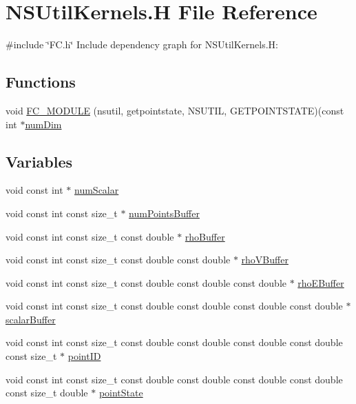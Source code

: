 \hypertarget{NSUtilKernels_8H}{}\section{N\+S\+Util\+Kernels.\+H File Reference}
\label{NSUtilKernels_8H}
{\ttfamily \#include \char`\"{}F\+C.\+h\char`\"{}}\newline
Include dependency graph for N\+S\+Util\+Kernels.\+H\+:
\subsection*{Functions}
\begin{DoxyCompactItemize}
\item 
void \hyperlink{NSUtilKernels_8H_a5abd4ece2d1e22d42d95512e3481c2c5}{F\+C\+\_\+\+M\+O\+D\+U\+LE} (nsutil, getpointstate, N\+S\+U\+T\+IL, G\+E\+T\+P\+O\+I\+N\+T\+S\+T\+A\+TE)(const int $\ast$\hyperlink{SATKernels_8H_a680185db8546de161968dabace9e94f1}{num\+Dim}
\end{DoxyCompactItemize}
\subsection*{Variables}
\begin{DoxyCompactItemize}
\item 
void const int $\ast$ \hyperlink{NSUtilKernels_8H_a97281fed7ef85b53d74753fbc3367cd4}{num\+Scalar}
\item 
void const int const size\+\_\+t $\ast$ \hyperlink{NSUtilKernels_8H_a327d32e541f87642bcb2cfc01c2ffb5e}{num\+Points\+Buffer}
\item 
void const int const size\+\_\+t const double $\ast$ \hyperlink{NSUtilKernels_8H_a9cf6caceb437dbe5893bc2693f11282a}{rho\+Buffer}
\item 
void const int const size\+\_\+t const double const double $\ast$ \hyperlink{NSUtilKernels_8H_a49109d7a1f9578103da42a76abf90454}{rho\+V\+Buffer}
\item 
void const int const size\+\_\+t const double const double const double $\ast$ \hyperlink{NSUtilKernels_8H_ac8e38c823aaa65559cdca01483e47101}{rho\+E\+Buffer}
\item 
void const int const size\+\_\+t const double const double const double const double $\ast$ \hyperlink{NSUtilKernels_8H_a065fa9e9e325101c378447214d37d8b1}{scalar\+Buffer}
\item 
void const int const size\+\_\+t const double const double const double const double const size\+\_\+t $\ast$ \hyperlink{NSUtilKernels_8H_acde79891dbc4fd8e02d5c1ff00f990a5}{point\+ID}
\item 
void const int const size\+\_\+t const double const double const double const double const size\+\_\+t double $\ast$ \hyperlink{NSUtilKernels_8H_afef8a617804a12ae0e3b9a7f8a9cec81}{point\+State}
\end{DoxyCompactItemize}


